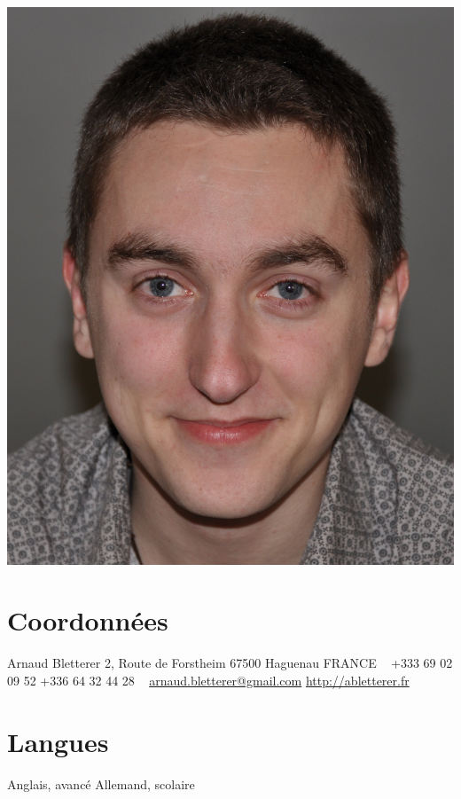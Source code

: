 \documentclass[]{friggeri-cv} %
\begin{document}


\begin{aside} %
\vspace{3.7cm}

\includegraphics[scale=0.05]{Profil}
\section{Coordonnées}
Arnaud Bletterer
2, Route de Forstheim
67500 Haguenau
FRANCE
~
+333 69 02 09 52
+336 64 32 44 28
~
\href{mailto:arnaud.bletterer@gmail.com}{arnaud.bletterer@gmail.com}
\href{http://abletterer.fr}{http://abletterer.fr}
\section{Langues}
Anglais, avancé
Allemand, scolaire
\end{aside}
\end{document}
